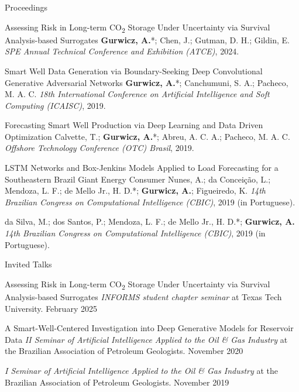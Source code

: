 \begin{cvcontentsection}{Proceedings}

\cvpublication
    {Assessing Risk in Long-term CO\textsubscript{2} Storage Under Uncertainty via Survival Analysis-based Surrogates}
    {\textbf{Gurwicz, A.}*; Chen, J.; Gutman, D. H.; Gildin, E.}
    {\textit{SPE Annual Technical Conference and Exhibition (ATCE)}, 2024.
    }

\cvpublication
    {Smart Well Data Generation via Boundary-Seeking Deep Convolutional Generative Adversarial Networks}
    {\textbf{Gurwicz, A.}*; Canchumuni, S. A.; Pacheco, M. A. C.}
    {\textit{18th International Conference on Artificial Intelligence and Soft Computing (ICAISC)},
    2019. }

\cvpublication
    {Forecasting Smart Well Production via Deep Learning and Data Driven Optimization}
    {Calvette, T.; \textbf{Gurwicz, A.}*; Abreu, A. C. A.; Pacheco, M. A. C.}
    {\textit{Offshore Technology Conference (OTC) Brasil}, 2019. }

\cvpublication
    {LSTM Networks and Box-Jenkins Models Applied to Load Forecasting for a Southeastern Brazil Giant Energy Consumer}
    {Nunes, A.; da Conceição, L.; Mendoza, L. F.; de Mello Jr., H. D.*; \textbf{Gurwicz, A.}; Figueiredo, K.}
    {\textit{14th Brazilian Congress on Computational Intelligence (CBIC)}, 2019 (in Portuguese).
    }

    {da Silva, M.; dos Santos, P.; Mendoza, L. F.; de Mello Jr., H. D.*; \textbf{Gurwicz, A.}}
    {\textit{14th Brazilian Congress on Computational Intelligence (CBIC)}, 2019 (in Portuguese).
    }

\end{cvcontentsection}

\begin{cvcontentsection}{Invited Talks}

\cvtalk
    {Assessing Risk in Long-term CO\textsubscript{2} Storage Under Uncertainty via Survival Analysis-based Surrogates}
    {\textit{INFORMS student chapter seminar} at Texas Tech University.}
    {February 2025}

\cvtalk
    {A Smart-Well-Centered Investigation into Deep Generative Models for Reservoir Data}
    {\textit{II Seminar of Artificial Intelligence Applied to the Oil \& Gas Industry} at the Brazilian Association of Petroleum Geologists.}
    {November 2020}

    {\textit{I Seminar of Artificial Intelligence Applied to the Oil \& Gas Industry} at the Brazilian Association of Petroleum Geologists.}
    {November 2019}

\end{cvcontentsection}
